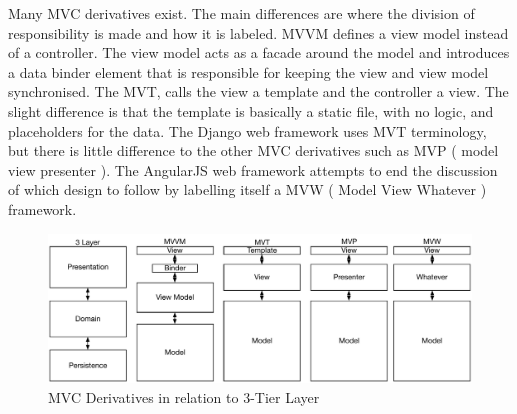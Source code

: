 Many MVC derivatives exist. The main differences are where the division of responsibility is made and how it is labeled. MVVM defines a view model instead of a controller. The view model acts as a facade around the model and introduces a data binder element that is responsible for keeping the view and view model synchronised. The MVT, calls the view a template and the controller a view. The slight difference is that the template is basically a static file, with no logic, and placeholders for the data. The Django web framework uses MVT terminology, but there is little difference to the other MVC derivatives such as MVP ( model view presenter ). The AngularJS web framework attempts to end the discussion of which design to follow by labelling itself a MVW ( Model View Whatever ) framework\cite{mvw}.

\begin{figure}[H]
    \centering
    \includegraphics[width=\textwidth,keepaspectratio]{assets/concept/mvc_3.pdf}
    \caption{MVC Derivatives in relation to 3-Tier Layer}
    \label{fig:mvc_alt}
\end{figure}





